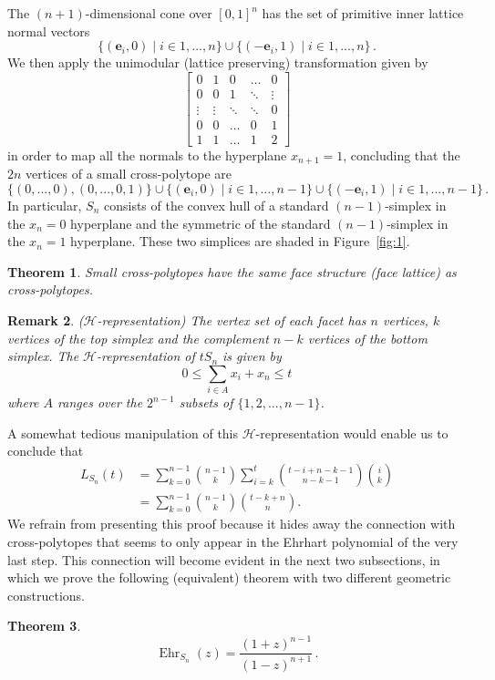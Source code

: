 \documentclass[a4paper,11pt,reqno]{amsart}
\DeclareMathOperator{\Ehr}{Ehr}
\newtheorem{theorem}{Theorem}[section]
\newtheorem{remark}[theorem]{Remark}
\begin{document}
The $(n+1)$-dimensional cone over $[0,1]^n$ has the set of primitive inner lattice normal vectors
\[
\{ (\bm{e}_i, 0) \mid i \in 1,...,n \} \cup \{ (-\bm{e}_i, 1) \mid i \in 1,...,n \} \,.
\]
We then apply the unimodular (lattice preserving) transformation given by
\[
\begin{bmatrix}
	0 & 1 & 0 & \dots  & 0 \\
	0 & 0 & 1 & \ddots  & \vdots \\
	\vdots & \vdots & \ddots & \ddots & 0 \\
	0 & 0 & \dots & 0 & 1 \\
	1 & 1 & \dots & 1  & 2
\end{bmatrix}
\]
in order to map all the normals to the hyperplane $x_{n+1}=1$, concluding that the $2n$ vertices of a small cross-polytope are
\[
\{(0,...,0), (0,...,0,1) \} \cup \{ (\bm{e}_i, 0) \mid i \in 1,...,n-1 \} \cup \{ (-\bm{e}_i, 1) \mid i \in 1,...,n-1 \} \,.
\]
In particular, $S_n$ consists of the convex hull of a standard $(n-1)$-simplex in the $x_n=0$ hyperplane and the symmetric of 
the standard $(n-1)$-simplex in the $x_n=1$ hyperplane. These two simplices are shaded in Figure~\ref{fig:1}.
\begin{theorem}
Small cross-polytopes have the same face structure (face lattice) as cross-polytopes.
\end{theorem}
\begin{remark}{($\mathcal{H}$-representation)}
The vertex set of each facet has $n$ vertices, $k$ vertices of the top simplex and the complement $n-k$ vertices of the bottom simplex. 
The $\mathcal{H}$-representation of $t S_n$ is given by
\[
0 \leq \sum_{i \in A} x_i + x_n \leq t 
\]
where $A$ ranges over the $2^{n-1}$ subsets of $\{1,2,...,n-1\}$.
\end{remark}
\noindent A somewhat tedious manipulation of this $\mathcal{H}$-representation would enable us to conclude that
\begin{align*}
	L_{S_n}(t)&=\sum_{k=0}^{n-1} {n-1\choose k} \sum_{i=k}^{t} {t-i+n-k-1 \choose n-k-1} {i \choose k}\\
	 &=  \sum_{k=0}^{n-1} {n-1\choose k} {t-k+n \choose n}.
\end{align*}
We refrain from presenting this proof because it hides away the connection with cross-polytopes that seems 
to only appear in the Ehrhart polynomial of the very last step. This connection will become evident in the next 
two subsections, in which we prove the following (equivalent) theorem with two different geometric constructions.
\begin{theorem} \label{teo:2}
\[
\Ehr_{S_n} (z)=\frac{(1+z)^{n-1}}{(1-z)^{n+1}}\,.
\]
\end{theorem}
\end{document}
